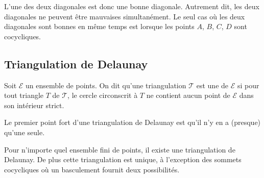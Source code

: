 \documentclass[11pt,class=report,crop=false]{standalone}
\begin{document}
L'une des deux diagonales est donc une bonne diagonale.
Autrement dit, les deux diagonales ne peuvent être mauvaises simultanément.
Le seul cas où les deux diagonales sont bonnes en même temps est lorsque les points $A$, $B$, $C$, $D$ sont cocycliques.



\subsection{Triangulation de Delaunay}

\begin{definition}
	Soit $\mathcal{E}$ un ensemble de points.
	On dit qu'une triangulation $\mathcal{T}$ est une  de $\mathcal{E}$
	si pour tout triangle $T$ de $\mathcal{T}$, le cercle circonscrit à $T$ ne contient aucun point de $\mathcal{E}$ dans son intérieur strict.
\end{definition}	

Le premier point fort d'une triangulation de Delaunay est qu'il n'y en a (presque) qu'une seule.
\begin{theoreme}
Pour n'importe quel ensemble fini de points, il existe une triangulation de Delaunay.
De plus cette triangulation est unique, à l'exception des sommets cocycliques où un basculement fournit deux possibilités.
\end{theoreme}

\end{document}
